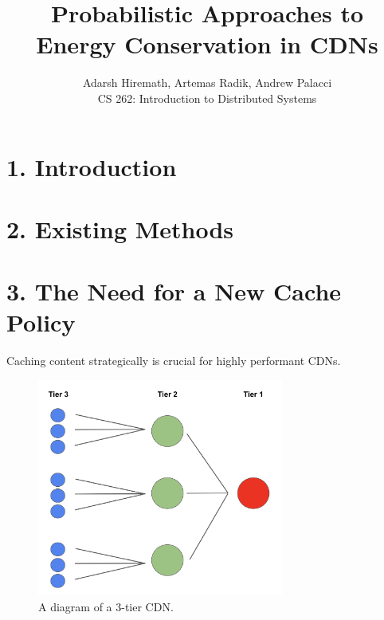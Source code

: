\documentclass[
	a4paper, %
	10pt, %
	unnumberedsections, %
	twoside, %
]{LTJournalArticle}
\title{Probabilistic Approaches to 
\\ Energy Conservation in CDNs} %
\author{%
	Adarsh Hiremath, Artemas Radik, Andrew Palacci \\
	CS 262: Introduction to Distributed Systems \\
}
\begin{document}
\maketitle %


\begin{abstract}
\end{abstract}
\section{1. Introduction}

\section{2. Existing Methods}

\section{3. The Need for a New Cache Policy}

Caching content strategically is crucial for highly performant CDNs. 

\begin{figure}[h]
	\begin{center}
		\includegraphics[width=8.1cm]{tier.png}
	\end{center}
	\caption{A diagram of a 3-tier CDN.}
	\label{fig:tier-cdn}	
\end{figure}




\end{document}
